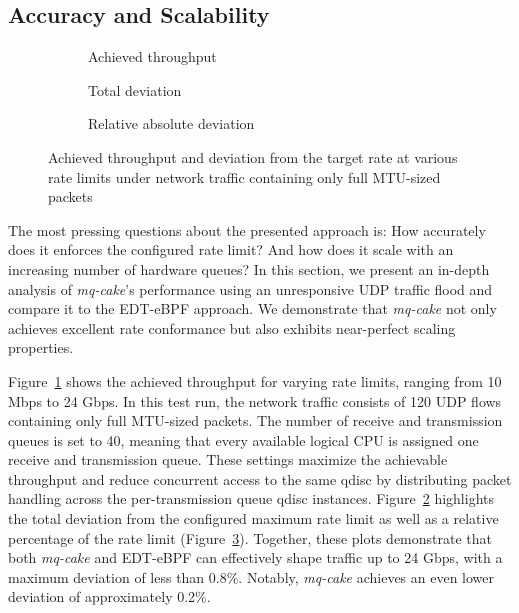 \subsection{Accuracy and Scalability}
\begin{figure*}
    \begin{subfigure}{0.3\linewidth}
        \centering
        
        \caption{Achieved throughput}\label{fig:tp_rate_conformance}
    \end{subfigure}
    \hfill
    \hspace{0.5cm}
    \begin{subfigure}{0.3\linewidth}
        \centering
        
        \caption{Total deviation}\label{fig:tp_deviation_total}
    \end{subfigure}
    \hfill
    \begin{subfigure}{0.3\linewidth}
        \centering
        
        \caption{Relative absolute deviation}\label{fig:tp_deviation_perc}
    \end{subfigure}
    \caption{Achieved throughput and deviation from the target rate at various rate limits under
    network traffic containing only full MTU-sized packets}\label{fig:accuracy}
\end{figure*}
The most pressing questions about the presented approach is: How accurately does it enforces the configured rate limit? And how does it scale with an increasing number of hardware queues?
In this section, we present an in-depth analysis of \textit{mq-cake}'s performance using an unresponsive UDP traffic flood and compare it to the EDT-eBPF approach. 
We demonstrate that \textit{mq-cake} not only achieves excellent rate conformance but also exhibits near-perfect scaling properties.

Figure~\ref{fig:tp_rate_conformance} shows the achieved throughput for varying rate limits, ranging from 10 Mbps to 24 Gbps.
%
In this test run, the network traffic consists of 120 UDP flows containing only full MTU-sized packets.
%
The number of receive and transmission queues is set to 40, meaning that every available logical CPU is assigned one receive and transmission queue.
%
These settings maximize the achievable throughput and reduce concurrent access to the same qdisc by distributing packet handling across the per-transmission queue qdisc instances.
%
Figure~\ref{fig:tp_deviation_total} highlights the total deviation from the configured maximum rate limit as well as a relative percentage of the rate limit (Figure~\ref{fig:tp_deviation_perc}).
%
Together, these plots demonstrate that both \textit{mq-cake} and EDT-eBPF can effectively shape traffic up to 24 Gbps, with a maximum deviation of less than 0.8\%. Notably, \textit{mq-cake} achieves an even lower deviation of approximately 0.2\%.

